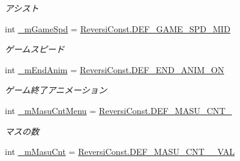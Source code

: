 \begin{DoxyCompactItemize}
\begin{DoxyCompactList}\small\item\em アシスト \end{DoxyCompactList}\item 
\mbox{\label{class_reversi_form_1_1_reversi_setting_add224ef1171504dd56f6d1269c3bcae3}} 
int \hyperlink{class_reversi_form_1_1_reversi_setting_add224ef1171504dd56f6d1269c3bcae3}{\+\_\+m\+Game\+Spd} = \hyperlink{class_reversi_form_1_1_reversi_const_a9091a98d585b1038089dfee667ab3428}{Reversi\+Const.\+D\+E\+F\+\_\+\+G\+A\+M\+E\+\_\+\+S\+P\+D\+\_\+\+M\+ID}
\begin{DoxyCompactList}\small\item\em ゲームスピード \end{DoxyCompactList}\item 
\mbox{\label{class_reversi_form_1_1_reversi_setting_adb549184880cfedc0629d1601b903553}} 
int \hyperlink{class_reversi_form_1_1_reversi_setting_adb549184880cfedc0629d1601b903553}{\+\_\+m\+End\+Anim} = \hyperlink{class_reversi_form_1_1_reversi_const_af0f33f359259375c061c6f12b97bfbb0}{Reversi\+Const.\+D\+E\+F\+\_\+\+E\+N\+D\+\_\+\+A\+N\+I\+M\+\_\+\+ON}
\begin{DoxyCompactList}\small\item\em ゲーム終了アニメーション \end{DoxyCompactList}\item 
\mbox{\label{class_reversi_form_1_1_reversi_setting_ae896fb5d5ec1fa200aab53fdce6199c5}} 
int \hyperlink{class_reversi_form_1_1_reversi_setting_ae896fb5d5ec1fa200aab53fdce6199c5}{\+\_\+m\+Masu\+Cnt\+Menu} = \hyperlink{class_reversi_form_1_1_reversi_const_aaa8981eb7f92080167144219038e5006}{Reversi\+Const.\+D\+E\+F\+\_\+\+M\+A\+S\+U\+\_\+\+C\+N\+T\+\_}
\begin{DoxyCompactList}\small\item\em マスの数 \end{DoxyCompactList}\item 
\mbox{\label{class_reversi_form_1_1_reversi_setting_ae78763c1d47582f2054524c0b1d38522}} 
int \hyperlink{class_reversi_form_1_1_reversi_setting_ae78763c1d47582f2054524c0b1d38522}{\+\_\+m\+Masu\+Cnt} = \hyperlink{class_reversi_form_1_1_reversi_const_a9c1eff92f5330aeca5790ead2b3c36eb}{Reversi\+Const.\+D\+E\+F\+\_\+\+M\+A\+S\+U\+\_\+\+C\+N\+T\+\_\+\_\+\+V\+AL}

\end{DoxyCompactItemize}
